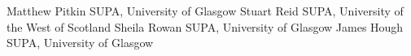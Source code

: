 Matthew Pitkin SUPA, University of Glasgow
Stuart Reid SUPA, University of the West of Scotland
Sheila Rowan SUPA, University of Glasgow
James Hough SUPA, University of Glasgow
